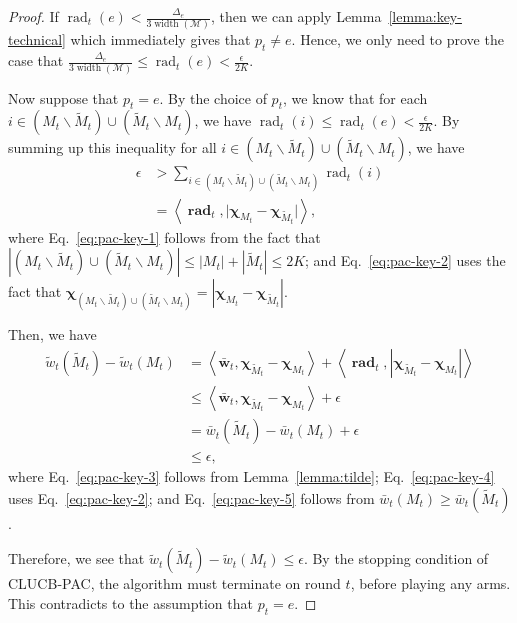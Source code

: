 \documentclass{article}
\newcommand{\AlgorithmPAC}{{\small \textsf{CLUCB-PAC}}\xspace}
\newcommand{\M}{\mathcal M}
\newcommand{\del}{\backslash}
\DeclareMathOperator{\rank}{width}
\DeclareMathOperator{\rad}{rad}
\newcommand{\inn}[1]{\left\langle #1 \right\rangle}
\renewcommand{\vec}[1]{\boldsymbol{#1}}
\begin{document}
\begin{proof}
If $\rad_t(e) < \frac{\Delta_e}{3\rank(\M)}$, then we can apply Lemma~\ref{lemma:key-technical} which immediately gives that $p_t\not= e$.
Hence, we only need to prove the case that $\frac{\Delta_e}{3\rank(\M)} \le \rad_t(e) < \frac{\epsilon}{2K}$.

Now suppose that $p_t = e$.
By the choice of $p_t$, we know that for each $i\in (M_t\del \tilde M_t) \cup (\tilde M_t \del M_t)$, we have
$\rad_t(i) \le \rad_t(e) < \frac{\epsilon}{2K}$.
By summing up this inequality for all $i \in (M_t\del \tilde M_t) \cup (\tilde M_t \del M_t)$, we have
\begin{align}
\epsilon &> \sum_{i\in (M_t\del \tilde M_t) \cup (\tilde M_t \del M_t)} \rad_t(i)\label{eq:pac-key-1} \\
		     &= \inn{\vec \rad_t, \big|\vec \chi_{M_t}-\vec \chi_{\tilde M_t}\big|}, \label{eq:pac-key-2}
\end{align}
where Eq.~\eqref{eq:pac-key-1} follows from the fact that
$|(M_t\del \tilde M_t) \cup (\tilde M_t \del M_t)| \le |M_t|+|\tilde M_t| \le 2K$;
and Eq.~\eqref{eq:pac-key-2} uses the fact that
$\vec \chi_{(M_t\del \tilde M_t) \cup (\tilde M_t \del M_t)} = |\vec \chi_{M_t}-\vec \chi_{\tilde M_t}|$.

Then, we have
\begin{align}
\tilde w_t(\tilde M_t) - \tilde w_t(M_t) 
&= \inn{\vec {\bar w}_t, \vec \chi_{\tilde M_t}-\vec\chi_{M_t}}+\inn{\vec \rad_t, |\vec \chi_{\tilde M_t}-\vec\chi_{M_t}|}
\label{eq:pac-key-3}\\
&\le \inn{\vec {\bar w}_t, \vec \chi_{\tilde M_t}-\vec\chi_{M_t}}+\epsilon 
\label{eq:pac-key-4}\\
&= \bar w_t(\tilde M_t)-\bar w_t(M_t)+\epsilon \nonumber\\
&\le \epsilon, \label{eq:pac-key-5}
\end{align}
where Eq.~\eqref{eq:pac-key-3} follows from Lemma~\ref{lemma:tilde};
Eq.~\eqref{eq:pac-key-4} uses Eq.~\eqref{eq:pac-key-2};
and Eq.~\eqref{eq:pac-key-5} follows from $\bar w_t(M_t)\ge \bar w_t(\tilde M_t)$.


Therefore, we see that $\tilde w_t(\tilde M_t)-\tilde w_t(M_t) \le \epsilon$.
By the stopping condition of \AlgorithmPAC, the algorithm must terminate on round $t$, before playing any arms. 
This contradicts to the assumption that $p_t = e$.
\end{proof}
\end{document}
